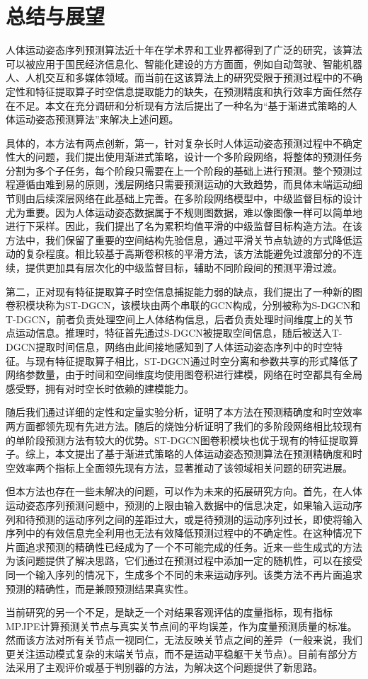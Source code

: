 \chapter{总结与展望}
人体运动姿态序列预测算法近十年在学术界和工业界都得到了广泛的研究，该算法可以被应用于国民经济信息化、智能化建设的方方面面，例如自动驾驶、智能机器人、人机交互和多媒体领域。而当前在这该算法上的研究受限于预测过程中的不确定性和特征提取算子时空信息提取能力的缺失，在预测精度和执行效率方面任然存在不足。本文在充分调研和分析现有方法后提出了一种名为“基于渐进式策略的人体运动姿态预测算法”来解决上述问题。

具体的，本方法有两点创新，第一，针对复杂长时人体运动姿态预测过程中不确定性大的问题，我们提出使用渐进式策略，设计一个多阶段网络，将整体的预测任务分割为多个子任务，每个阶段只需要在上一个阶段的基础上进行预测。整个预测过程遵循由难到易的原则，浅层网络只需要预测运动的大致趋势，而具体末端运动细节则由后续深层网络在此基础上完善。在多阶段网络模型中，中级监督目标的设计尤为重要。因为人体运动姿态数据属于不规则图数据，难以像图像一样可以简单地进行下采样。因此，我们提出了名为累积均值平滑的中级监督目标构造方法。在该方法中，我们保留了重要的空间结构先验信息，通过平滑关节点轨迹的方式降低运动的复杂程度。相比较基于高斯卷积核的平滑方法，该方法能避免过渡部分的不连续，提供更加具有层次化的中级监督目标，辅助不同阶段间的预测平滑过渡。

第二，正对现有特征提取算子时空信息捕捉能力弱的缺点，我们提出了一种新的图卷积模块称为ST-DGCN，该模块由两个串联的GCN构成，分别被称为S-DGCN和T-DGCN，前者负责处理空间上人体结构信息，后者负责处理时间维度上的关节点运动信息。推理时，特征首先通过S-DGCN被提取空间信息，随后被送入T-DGCN提取时间信息，网络由此间接地感知到了人体运动姿态序列中的时空特征。与现有特征提取算子相比，ST-DGCN通过时空分离和参数共享的形式降低了网络参数量，由于时间和空间维度均使用图卷积进行建模，网络在时空都具有全局感受野，拥有对时空长时依赖的建模能力。

随后我们通过详细的定性和定量实验分析，证明了本方法在预测精确度和时空效率两方面都领先现有先进方法。随后的烧蚀分析证明了我们的多阶段网络相比较现有的单阶段预测方法有较大的优势。ST-DGCN图卷积模块也优于现有的特征提取算子。综上，本文提出了基于渐进式策略的人体运动姿态预测算法在预测精确度和时空效率两个指标上全面领先现有方法，显著推动了该领域相关问题的研究进展。

但本方法也存在一些未解决的问题，可以作为未来的拓展研究方向。首先，在人体运动姿态序列预测问题中，预测的上限由输入数据中的信息决定，如果输入运动序列和待预测的运动序列之间的差距过大，或是待预测的运动序列过长，即使将输入序列中的有效信息完全利用也无法有效降低预测过程中的不确定性。在这种情况下片面追求预测的精确性已经成为了一个不可能完成的任务。近来一些生成式的方法为该问题提供了解决思路，它们通过在预测过程中添加一定的随机性，可以在接受同一个输入序列的情况下，生成多个不同的未来运动序列。该类方法不再片面追求预测的精确性，而是兼顾预测结果真实性。

当前研究的另一个不足，是缺乏一个对结果客观评估的度量指标，现有指标MPJPE计算预测关节点与真实关节点间的平均误差，作为度量预测质量的标准。然而该方法对所有关节点一视同仁，无法反映关节点之间的差异（一般来说，我们更关注运动模式复杂的末端关节点，而不是运动平稳躯干关节点）。目前有部分方法采用了主观评价或基于判别器的方法，为解决这个问题提供了新思路。